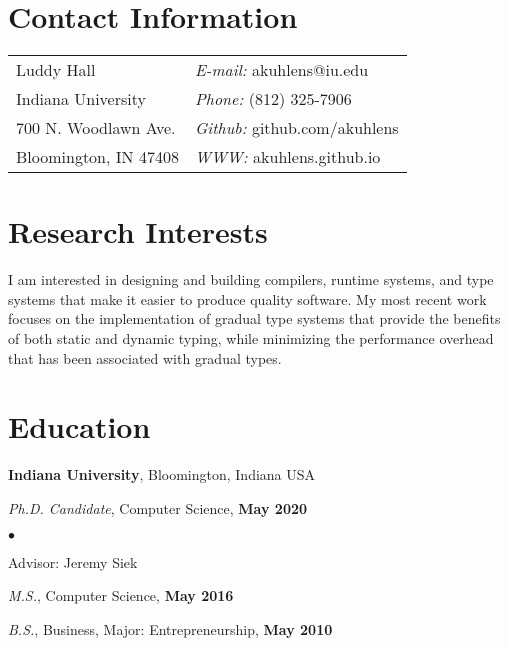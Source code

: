 \documentclass[resmargin,line]{res}
\newenvironment{list1}{
  \begin{list}{\ding{113}}{%
      \setlength{\itemsep}{0in}
      \setlength{\parsep}{0in} \setlength{\parskip}{0in}
      \setlength{\topsep}{0in} \setlength{\partopsep}{0in} 
      \setlength{\leftmargin}{0.17in}}}{\end{list}}
\newenvironment{list2}{
  \begin{list}{$\bullet$}{%
      \setlength{\itemsep}{0in}
      \setlength{\parsep}{0in} \setlength{\parskip}{0in}
      \setlength{\topsep}{0in} \setlength{\partopsep}{0in} 
      \setlength{\leftmargin}{0.2in}}}{\end{list}}
\begin{document}

\begin{resume}
\section{\sc Contact Information}
\vspace{.05in}
\begin{tabular}{@{}p{2in}p{4in}}
Luddy Hall                 & {\it E-mail:} akuhlens@iu.edu \\
Indiana University         & {\it Phone:}  (812) 325-7906 \\
700 N. Woodlawn Ave.       & {\it Github:} github.com/akuhlens  \\       
Bloomington, IN 47408      & {\it WWW:} akuhlens.github.io \\     
\end{tabular}

\section{\sc Research Interests}
I am interested in designing and building compilers, runtime systems,
and type systems that make it easier to produce quality software. My
most recent work focuses on the implementation of gradual type systems
that provide the benefits of both static and dynamic typing, while
minimizing the performance overhead that has been associated with
gradual types.

\section{\sc Education}
{\bf Indiana University},
Bloomington, Indiana USA\\
\vspace*{-.15in}
\begin{list1}
\item[] {\em Ph.D. Candidate}, Computer Science, \hfill {\bf May 2020}\\
  \vspace*{-.15in}
  \begin{list2}
  \item[] Advisor:  Jeremy Siek
  \end{list2}
\item[] {\em M.S.}, Computer Science,  \hfill {\bf May 2016}
\item[] {\em B.S.}, Business, Major: Entrepreneurship, \hfill{} {\bf May 2010}
\end{list1}


\end{resume}
\end{document}
